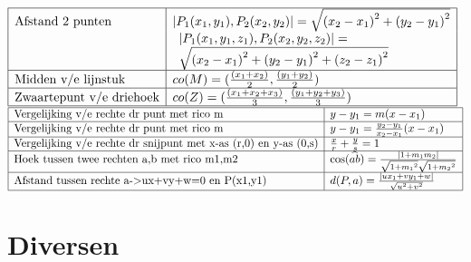 \documentclass[a5paper]{article}
\begin{document}
{$
\begin{array}{|l|l|}
\hline
\text{Afstand 2 punten} & \left| {{P_1}({x_1},{y_1}),{P_2}({x_2},{y_2})} \right| = \sqrt {{{({x_2} - {x_1})}^2} + {{({y_2} - {y_1})}^2}}  \\
 & \begin{array}{l}
\left| {{P_1}({x_1},{y_1},{z_1}),{P_2}({x_2},{y_2},{z_2})} \right| = \\
\sqrt {{{({x_2} - {x_1})}^2} + {{({y_2} - {y_1})}^2} + {{({z_2} - {z_1})}^2}} 
\end{array} \\
\hline
\text{Midden v/e lijnstuk} & co(M) = (\frac{{({x_1} + {x_2})}}{2},\frac{{({y_1} + {y_2})}}{2})\\
\hline
\text{Zwaartepunt v/e driehoek} & co(Z) = (\frac{{({x_1} + {x_2} + {x_3})}}{3},\frac{{({y_1} + {y_2} + {y_3})}}{3})\\
\hline
\end{array}
$
\newline
$
\begin{array}{|l|l|}
\hline
\text{Vergelijking v/e rechte dr punt met rico m} & y - {y_1} = m(x - {x_1})  \\
\hline
\text{Vergelijking v/e rechte dr punt met rico m} & y - {y_1} = \frac{{{y_2} - {y_1}}}{{{x_2} - {x_1}}}(x - {x_1})  \\
\hline
\text{Vergelijking v/e rechte dr snijpunt met x-as (r,0) en y-as (0,s)} & \frac{x}{r} + \frac{y}{s} = 1  \\
\hline
\text{Hoek tussen twee rechten a,b met rico m1,m2} & \cos (\widehat {ab}) = \frac{{\left| {1 + {m_1}{m_2}} \right|}}{{\sqrt {1 + {m_1}^2} \sqrt {1 + {m_2}^2} }}  \\
\hline
\text{Afstand tussen rechte a->ux+vy+w=0 en P(x1,y1)} & d(P,a) = \frac{{\left| {u{x_1} + v{y_1} + w} \right|}}{{\sqrt {{u^2} + {v^2}} }}  \\
\hline
\end{array}
$

\newpage

\section{Diversen}
}
\end{document}
